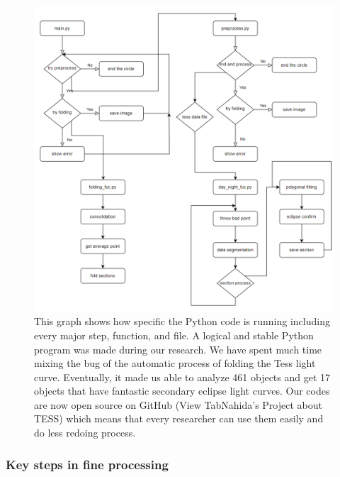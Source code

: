 \documentclass{article}
\begin{document}
\begin{figure}[H]
    \centering
    \includegraphics[width=0.8\linewidth]{image/code_process.jpg}
    \captionsetup{font=small} 
    \caption{This graph shows how specific the Python code is running including every major step, function, and file. A logical and stable Python program was made during our research. We have spent much time mixing the bug of the automatic process of folding the Tess light curve. Eventually, it made us able to analyze 461 objects and get 17 objects that have fantastic secondary eclipse light curves. Our codes are now open source on GitHub (View TabNahida's Project about TESS) which means that every researcher can use them easily and do less redoing process.}
    \label{fig:code_p}
\end{figure}

\subsubsection{Key steps in fine processing}
\end{document}
